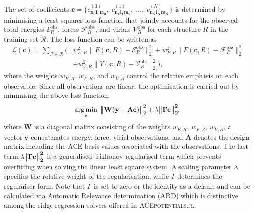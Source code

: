 The set of coefficients 
\( \textbf{c} = \{ c^{(0)}_{\mathbf{n_{0}l_{0}m_{0}}},\; c^{(1)}_{\mathbf{n_{1}l_{1}m_{1}}},\; \dots,\; c^{(N)}_{\mathbf{n_{N}l_{N}m_{N}}} \} \)
is determined by minimising a least-squares loss function that jointly accounts for the observed total energies
\(\mathcal{E}^{\text{obs}}_{R}\), forces \(\mathcal{F}^{\text{obs}}_{R}\), and virials \(\mathcal{V}^{\text{obs}}_{R}\)
for each structure \( R \) in the training set \(\mathcal{R}\).
The loss function can be written as
\begin{equation}
\label{equ:loss}
\begin{split}
\mathcal{L}(\textbf{c}) =
\sum_{R \in \mathcal{R}} \big(
& w_{E,R}^{2} \big\| E(\textbf{c}, R) - \mathcal{E}^{\text{obs}}_{R} \big\|_2^2
+ w_{F,R}^{2} \big\| F(\textbf{c}, R) - \mathcal{F}^{\text{obs}}_{R} \big\|_2^2
\\ &
+ w_{V,R}^{2} \big\| V(\textbf{c}, R) - \mathcal{V}^{\text{obs}}_{R} \big\|_2^2
\big),
\end{split}
\end{equation}
where the weights \( w_{E,R} \), \( w_{F,R} \), and \( w_{V,R} \) control the relative emphasis on each observable.
Since all observations are linear, the optimisation is carried out by minimising the above loss function,
\begin{equation}
    \label{equ:minloss}
    \operatorname*{arg\,min}_{\textbf{c}}\;\big\| \mathbf{W} (\mathbf{y} - \mathbf{A}\mathbf{c}) \big\|_2^2 + \lambda \big\| \bf \Gamma \textbf{c}\big\|_2^2,
\end{equation}
where \(\mathbf{W}\) is a diagonal matrix consisting of the weights \( w_{E,R} \), \( w_{F,R} \), \( w_{V,R} \), a vector \(\mathbf{y}\) concatenates energy, force, virial observations, and \(\mathbf{A}\) denotes the design matrix including the ACE basis values associated with the observations. The last term \(\lambda \big\| \bf \Gamma \textbf{c}\big\|_2^2\) is a generalised Tikhonov regularised term which prevents overfitting when solving the linear least square system. A scaling parameter \(\lambda\) specifies the relative weight of the regularisation, while \(\Gamma\) determines the regulariser form. Note that \(\Gamma\) is set to zero or the identity as a default and can be calculated via Automatic Relevance determination (ARD) which is distinctive among the ridge regression solvers offered in \textsc{ACEpotentials.jl}.


